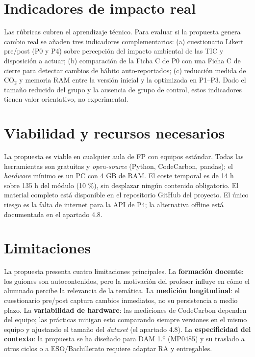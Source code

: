 \FloatBarrier

\newpage
\section{Indicadores de impacto real}

Las rúbricas cubren el aprendizaje técnico. Para evaluar si la propuesta genera cambio real se añaden tres indicadores complementarios: (a) cuestionario Likert pre/post (P0 y P4) sobre percepción del impacto ambiental de las TIC y disposición a actuar; (b) comparación de la Ficha C de P0 con una Ficha C de cierre para detectar cambios de hábito auto-reportados; (c) reducción medida de CO$_2$ y memoria RAM entre la versión inicial y la optimizada en P1–P3. Dado el tamaño reducido del grupo y la ausencia de grupo de control, estos indicadores tienen valor orientativo, no experimental.

\section{Viabilidad y recursos necesarios}

La propuesta es viable en cualquier aula de FP con equipos estándar. Todas las herramientas son gratuitas y \textit{open-source} (Python, CodeCarbon, pandas); el \textit{hardware} mínimo es un PC con 4 GB de RAM. El coste temporal es de 14 h sobre 135 h del módulo (10 \%), sin desplazar ningún contenido obligatorio. El material completo está disponible en el repositorio GitHub del proyecto. El único riesgo es la falta de internet para la API de P4; la alternativa offline está documentada en el apartado 4.8.

\section{Limitaciones}

La propuesta presenta cuatro limitaciones principales. La \textbf{formación docente}: los guiones son autocontenidos, pero la motivación del profesor influye en cómo el alumnado percibe la relevancia de la temática. La \textbf{medición longitudinal}: el cuestionario pre/post captura cambios inmediatos, no su persistencia a medio plazo. La \textbf{variabilidad de hardware}: las mediciones de CodeCarbon dependen del equipo; las prácticas mitigan esto comparando siempre versiones en el mismo equipo y ajustando el tamaño del \textit{dataset} (el apartado 4.8). La \textbf{especificidad del contexto}: la propuesta se ha diseñado para DAM 1.º (MP0485) y su traslado a otros ciclos o a ESO/Bachillerato requiere adaptar RA y entregables.
